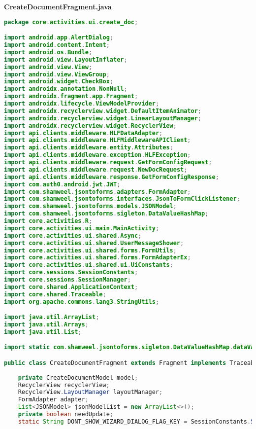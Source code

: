 \textbf{CreateDocumentFragment.java}
\begin{lstlisting}[language=Java]
package core.activities.ui.create_doc;

import android.app.AlertDialog;
import android.content.Intent;
import android.os.Bundle;
import android.view.LayoutInflater;
import android.view.View;
import android.view.ViewGroup;
import android.widget.CheckBox;
import androidx.annotation.NonNull;
import androidx.fragment.app.Fragment;
import androidx.lifecycle.ViewModelProvider;
import androidx.recyclerview.widget.DefaultItemAnimator;
import androidx.recyclerview.widget.LinearLayoutManager;
import androidx.recyclerview.widget.RecyclerView;
import api.clients.middleware.HLFDataAdapter;
import api.clients.middleware.HLFMiddlewareAPIClient;
import api.clients.middleware.entity.Attributes;
import api.clients.middleware.exception.HLFException;
import api.clients.middleware.request.GetFormConfigRequest;
import api.clients.middleware.request.NewDocRequest;
import api.clients.middleware.response.GetFormConfigResponse;
import com.auth0.android.jwt.JWT;
import com.shamweel.jsontoforms.adapters.FormAdapter;
import com.shamweel.jsontoforms.interfaces.JsonToFormClickListener;
import com.shamweel.jsontoforms.models.JSONModel;
import com.shamweel.jsontoforms.sigleton.DataValueHashMap;
import core.activities.R;
import core.activities.ui.main.MainActivity;
import core.activities.ui.shared.Async;
import core.activities.ui.shared.UserMessageShower;
import core.activities.ui.shared.forms.FormUtils;
import core.activities.ui.shared.forms.FormAdapterEx;
import core.activities.ui.shared.ui.UiConstants;
import core.sessions.SessionConstants;
import core.sessions.SessionManager;
import core.shared.ApplicationContext;
import core.shared.Traceable;
import org.apache.commons.lang3.StringUtils;

import java.util.ArrayList;
import java.util.Arrays;
import java.util.List;

import static com.shamweel.jsontoforms.sigleton.DataValueHashMap.dataValueHashMap;

public class CreateDocumentFragment extends Fragment implements Traceable, JsonToFormClickListener, UserMessageShower {
	
	private CreateDocumentModel model;
	RecyclerView recyclerView;
	RecyclerView.LayoutManager layoutManager;
	FormAdapter adapter;
	List<JSONModel> jsonModelList = new ArrayList<>();
	private boolean needUpdate;
	static String DONT_SHOW_WIZARD_DIALOG_FLAG_KEY = SessionConstants.SESSION_PREFERENCES_PREFIX + "DONT_SHOW_WIZARD_DIALOG_FLAG";
	

\end{lstlisting}
